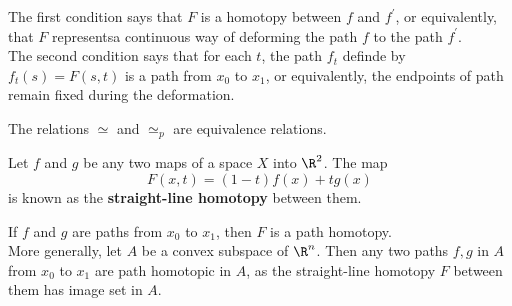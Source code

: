 \begin{remark}
The first condition says that $F$ is a homotopy between $f$ and $f^{\prime}$, or equivalently, that $F$ representsa continuous way of deforming the path $f$ to the path $f^{\prime}$. \\

The second condition says that for each $t$, the path $f_t$ definde by $f_t(s) = F(s, t)$ is a path from $x_0$ to $x_1$, or equivalently, the endpoints of path remain fixed during the deformation.
\end{remark}

\begin{lemma}
The relations $\simeq$ and $\simeq_p$ are equivalence relations.
\end{lemma}

\begin{eg}
Let $f$ and $g$ be any two maps of a space $X$ into $\R^2$. The map 
\[
    F(x, t) = (1-t) f(x) + tg(x)
\]
is known as the \textbf{straight-line homotopy} between them.
\end{eg}

\begin{remark}
If $f$ and $g$ are paths from $x_0$ to $x_1$, then $F$ is a path homotopy. \\

More generally, let $A$ be a convex subspace of $\R^n$. Then any two paths $f, g$ in $A$ from $x_0$ to $x_1$ are path homotopic in $A$, as
the straight-line homotopy $F$ between them has image set in $A$.
\end{remark}

